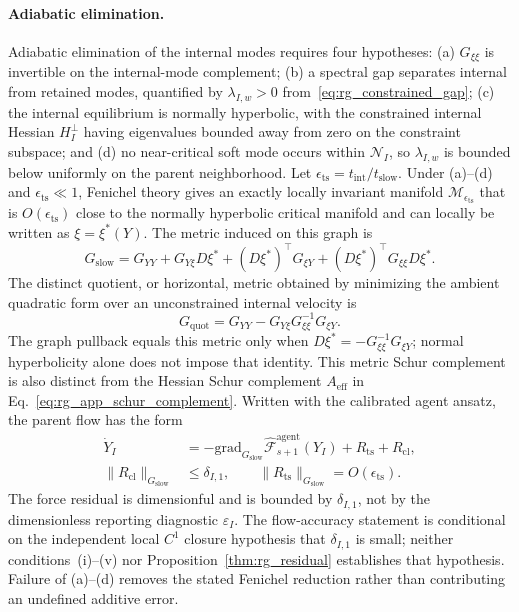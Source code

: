 \documentclass[11pt]{article}
\begin{document}
\paragraph{Adiabatic elimination.}
Adiabatic elimination of the internal modes requires four hypotheses: (a) $G_{\xi\xi}$ is invertible on the internal-mode complement; (b) a spectral gap separates internal from retained modes, quantified by $\lambda_{I,w} > 0$ from~\eqref{eq:rg_constrained_gap}; (c) the internal equilibrium is normally hyperbolic, with the constrained internal Hessian $H_I^\perp$ having eigenvalues bounded away from zero on the constraint subspace; and (d) no near-critical soft mode occurs within $\mathcal{N}_I$, so $\lambda_{I,w}$ is bounded below uniformly on the parent neighborhood. Let $\epsilon_{\mathrm{ts}}=t_{\mathrm{int}}/t_{\mathrm{slow}}$. Under (a)--(d) and $\epsilon_{\mathrm{ts}}\ll1$, Fenichel theory gives an exactly locally invariant manifold $\mathcal{M}_{\epsilon_{\mathrm{ts}}}$ that is $O(\epsilon_{\mathrm{ts}})$ close to the normally hyperbolic critical manifold and can locally be written as $\xi=\xi^*(Y)$. The metric induced on this graph is
\begin{equation}
G_{\mathrm{slow}}=G_{YY}+G_{Y\xi}D\xi^*+(D\xi^*)^\top G_{\xi Y}+(D\xi^*)^\top G_{\xi\xi}D\xi^*.
\label{eq:rg_slow_graph_metric}
\end{equation}
The distinct quotient, or horizontal, metric obtained by minimizing the ambient quadratic form over an unconstrained internal velocity is
\begin{equation}
G_{\mathrm{quot}}=G_{YY}-G_{Y\xi}G_{\xi\xi}^{-1}G_{\xi Y}.
\end{equation}
The graph pullback equals this metric only when $D\xi^*=-G_{\xi\xi}^{-1}G_{\xi Y}$; normal hyperbolicity alone does not impose that identity. This metric Schur complement is also distinct from the Hessian Schur complement $A_{\mathrm{eff}}$ in Eq.~\eqref{eq:rg_app_schur_complement}. Written with the calibrated agent ansatz, the parent flow has the form
\begin{align}
\dot{Y}_I
 &= -\mathrm{grad}_{G_{\mathrm{slow}}}\widehat{\mathcal{F}}^{\mathrm{agent}}_{s+1}(Y_I)+R_{\mathrm{ts}}+R_{\mathrm{cl}}, \nonumber\\
\|R_{\mathrm{cl}}\|_{G_{\mathrm{slow}}}
 &\leq \delta_{I,1}, \qquad
\|R_{\mathrm{ts}}\|_{G_{\mathrm{slow}}}=O(\epsilon_{\mathrm{ts}}).
\label{eq:rg_schur_flow}
\end{align}
The force residual is dimensionful and is bounded by $\delta_{I,1}$, not by the dimensionless reporting diagnostic $\varepsilon_I$. The flow-accuracy statement is conditional on the independent local $C^1$ closure hypothesis that $\delta_{I,1}$ is small; neither conditions~(i)--(v) nor Proposition~\ref{thm:rg_residual} establishes that hypothesis. Failure of (a)--(d) removes the stated Fenichel reduction rather than contributing an undefined additive error.
\end{document}
